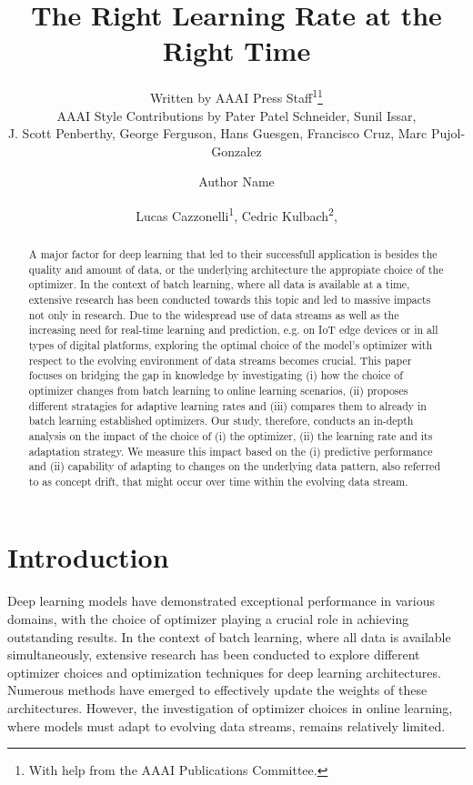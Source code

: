 \documentclass[letterpaper]{article} %
\author{
    Written by AAAI Press Staff\textsuperscript{\rm 1}\thanks{With help from the AAAI Publications Committee.}\\
    AAAI Style Contributions by Pater Patel Schneider,
    Sunil Issar,\\
    J. Scott Penberthy,
    George Ferguson,
    Hans Guesgen,
    Francisco Cruz\equalcontrib,
    Marc Pujol-Gonzalez\equalcontrib}
\author{
    Author Name
}
\title{The Right Learning Rate at the Right Time}
\author{
    Lucas Cazzonelli\textsuperscript{\rm 1},
    Cedric Kulbach\textsuperscript{\rm 2},
}
\begin{document}
\maketitle


\begin{abstract}

	\noindent A major factor for deep learning that led to their successfull application is besides the quality and amount of data, or the underlying architecture the appropiate choice of the optimizer.
	In the context of batch learning, where all data is available at a time, extensive research has been conducted towards this topic and led to massive impacts not only in research. 
	Due to the widespread use of data streams as well as the increasing need for real-time learning and prediction, e.g. on IoT edge devices or in all types of digital platforms, exploring the optimal choice of the model's optimizer with respect to the evolving environment of data streams becomes crucial.
	This paper focuses on bridging the gap in knowledge by investigating (i) how the choice of optimizer changes from batch learning to online learning scenarios, (ii) proposes different stratagies for adaptive learning rates and (iii) compares them to already in batch learning established optimizers.
	Our study, therefore, conducts an in-depth analysis on the impact of the choice of (i) the optimizer, (ii) the learning rate and its adaptation strategy. 
	We measure this impact based on the (i) predictive performance and (ii) capability of adapting to changes on the underlying data pattern, also referred to as concept drift, that might occur over time within the evolving data stream.

\end{abstract}

\section{Introduction}
Deep learning models have demonstrated exceptional performance in various domains, with the choice of optimizer playing a crucial role in achieving outstanding results.
In the context of batch learning, where all data is available simultaneously, extensive research has been conducted to explore different optimizer choices and optimization techniques for deep learning architectures.
Numerous methods have emerged to effectively update the weights of these architectures.
However, the investigation of optimizer choices in online learning, where models must adapt to evolving data streams, remains relatively limited.
\end{document}
